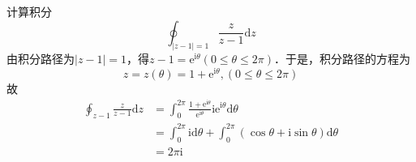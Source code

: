 \begin{example}{}
计算积分
\begin{equation}
\oint_{|z-1|=1} \frac{z}{z-1} \mathrm{d} z
\end{equation}
由积分路径为$|z −1|=1$，得$z-1=\mathrm{e}^{\mathrm{i} \theta}(0 \leqslant \theta \leqslant 2 \pi)$．于是，积分路径的方程为
\begin{equation}
z=z(\theta)=1+\mathrm{e}^{\mathrm{i} \theta},(0 \leqslant \theta \leqslant 2 \pi)
\end{equation}
故
\begin{equation}
\begin{aligned} \oint_{z-1} \frac{z}{z-1} \mathrm{d} z &=\int_{0}^{2 \pi} \frac{1+\mathrm{e}^{\mathrm{i} \theta}}{\mathrm{e}^{\mathrm{i} \theta}} \mathrm{ie}^{\mathrm{i} \theta} \mathrm{d} \theta \\ &=\int_{0}^{2 \pi} \mathrm{id} \theta+\int_{0}^{2 \pi}(\cos \theta+\mathrm{i} \sin \theta) \mathrm{d} \theta \\ &=2 \pi \mathrm{i} \end{aligned}
\end{equation}
\end{example}